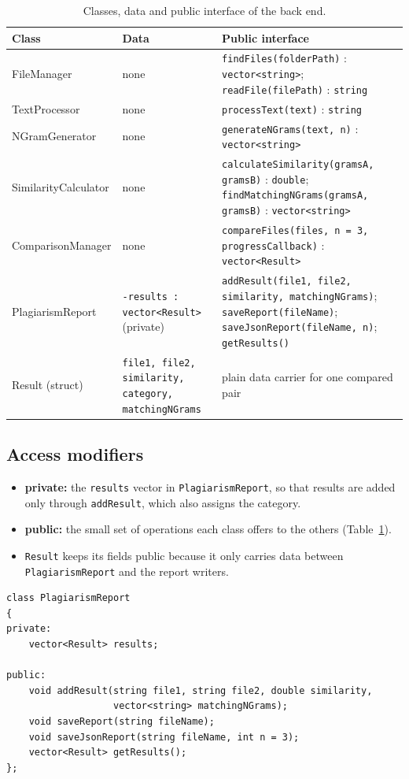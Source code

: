 \documentclass[12pt,a4paper,oneside]{book}
\begin{document}
\begin{table}[H]
\centering
\footnotesize
\begin{tabular}{@{}p{3.4cm}p{4.0cm}p{7.6cm}@{}}
\toprule
Class & Data & Public interface \\
\midrule
FileManager & none & \texttt{findFiles(folderPath)} : \texttt{vector<string>}; \texttt{readFile(filePath)} : \texttt{string} \\
TextProcessor & none & \texttt{processText(text)} : \texttt{string} \\
NGramGenerator & none & \texttt{generateNGrams(text, n)} : \texttt{vector<string>} \\
SimilarityCalculator & none & \texttt{calculateSimilarity(gramsA, gramsB)} : \texttt{double}; \texttt{findMatchingNGrams(gramsA, gramsB)} : \texttt{vector<string>} \\
ComparisonManager & none & \texttt{compareFiles(files, n = 3, progressCallback)} : \texttt{vector<Result>} \\
PlagiarismReport & \texttt{-results : vector<Result>} (private) & \texttt{addResult(file1, file2, similarity, matchingNGrams)}; \texttt{saveReport(fileName)}; \texttt{saveJsonReport(fileName, n)}; \texttt{getResults()} \\
Result (struct) & \texttt{file1, file2, similarity, category, matchingNGrams} & plain data carrier for one compared pair \\
\bottomrule
\end{tabular}
\caption{Classes, data and public interface of the back end.}
\label{tab:classes}
\end{table}

\subsection{Access modifiers}
\begin{itemize}
  \item \textbf{private:} the \texttt{results} vector in \texttt{PlagiarismReport}, so that results are added only through \texttt{addResult}, which also assigns the category.
  \item \textbf{public:} the small set of operations each class offers to the others (Table~\ref{tab:classes}).
  \item \texttt{Result} keeps its fields public because it only carries data between \texttt{PlagiarismReport} and the report writers.
\end{itemize}

\begin{lstlisting}[caption={Encapsulation: the results can only be changed through addResult, which assigns the category.}, label={lst:encap}]
class PlagiarismReport
{
private:
    vector<Result> results;

public:
    void addResult(string file1, string file2, double similarity,
                   vector<string> matchingNGrams);
    void saveReport(string fileName);
    void saveJsonReport(string fileName, int n = 3);
    vector<Result> getResults();
};
\end{lstlisting}
\end{document}
